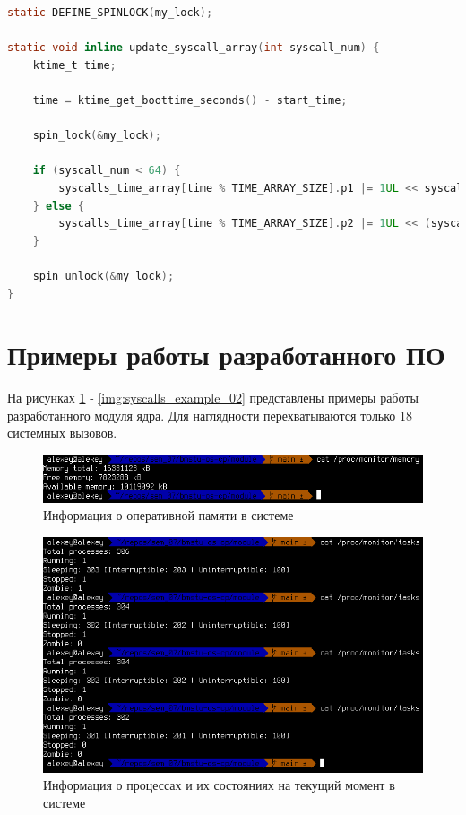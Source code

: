 \begin{lstlisting}[label=lst:update_syscall_array, caption=Реализация функции \texttt{update\_syscall\_array()}, language=c]
static DEFINE_SPINLOCK(my_lock);

static void inline update_syscall_array(int syscall_num) {
	ktime_t time;
	
	time = ktime_get_boottime_seconds() - start_time;
	
	spin_lock(&my_lock);
	
	if (syscall_num < 64) {
		syscalls_time_array[time % TIME_ARRAY_SIZE].p1 |= 1UL << syscall_num;
	} else {
		syscalls_time_array[time % TIME_ARRAY_SIZE].p2 |= 1UL << (syscall_num % 64);
	}
	
	spin_unlock(&my_lock);
}
\end{lstlisting}

\section{Примеры работы разработанного ПО}

На рисунках \ref{img:memory_example} - \ref{img:syscalls_example_02} представлены примеры работы разработанного модуля ядра. Для наглядности перехватываются только 18 системных вызовов.

\begin{figure}[h!]
	\begin{center}
		\includegraphics[scale=0.6]{img/memory_example.png}
	\end{center}
	\captionsetup{justification=centering}
	\caption{Информация о оперативной памяти в системе}
	\label{img:memory_example}
\end{figure}

\begin{figure}[h!]
	\begin{center}
		\includegraphics[scale=0.6]{img/tasks_example.png}
	\end{center}
	\captionsetup{justification=centering}
	\caption{Информация о процессах и их состояниях на текущий момент в системе}
	\label{img:tasks_example}
\end{figure}

